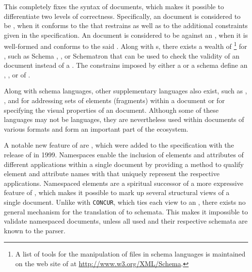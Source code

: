 \documentclass{book}
\begin{document}
This  completely fixes the syntax of  documents, which
makes it possible to differentiate two levels of correctness. Specifically, an
 document is considered to be %
, when it conforms to the 
 that restrains  as well as to the additional
constraints given in the specification. An  document is
considered to be   against an
 , when it is well-formed and conforms to the said
 .  Along with s, there exists a wealth
of \footnote{
  A list of tools for the manipulation of files in  schema
  languages is maintained on the web site of  at
  \url{http://www.w3.org/XML/Schema}.
} for , such as   Schema
, , or Schematron that can be used to
check the validity of an  document instead of a .
The constrains imposed by either a  or a schema define an
, , or 
 
 of .

Along with schema languages, other supplementary languages also exist, such as
, , and  for addressing sets of elements
(fragments) within a  document or  for specifying the
visual properties of an  document. Although some of these
languages may not be  languages, they are nevertheless used within
documents of various  formats and form an important part of the
ecosystem.

A notable new feature of  are %
, which were added to the specification with the
release of \cite{bray99} in 1999. Namespaces enable the inclusion of elements
and attributes of different  applications within a single
 document by providing a method to qualify element and attribute
names with  that uniquely represent the respective 
applications. Namespaced elements are a spiritual successor of a more expressive
 feature of , which makes it possible to mark
up several structural views of a single document.  Unlike with \texttt{CONCUR},
which ties each view to an  , there exists no
general mechanism for the translation of  to  schemata.
This makes it impossible to validate namespaced  documents, unless
all used  and their respective schemata are known to the parser.
\end{document}

